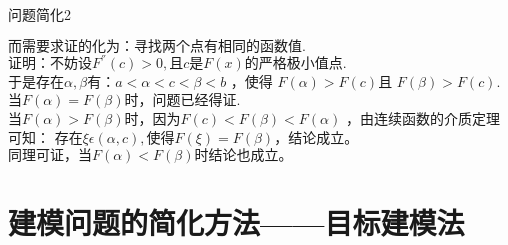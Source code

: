 \documentclass{beamer}
\begin{document}
\begin{frame}{问题简化2}
	\begin{spacing}{1.5}
		$\text{而需要求证的化为：寻找两个点有相同的函数值}.
		$
		$
		\text{证明：不妨设}F^{''}\left( c \right) >0,\text{且}c\text{是}F\left( x \right) \text{的严格极小值点}.
		$
		$
		\text{于是存在}\alpha ,\beta \text{有：}a<\alpha <c<\beta <b
		$
		，使得
		$F\left( \alpha \right) >F\left( c \right)
		$且
		$F\left( \beta \right) >F\left( c \right).
		$\\
		$
		\text{当}F\left( \alpha \right) =F\left( \beta \right) \text{时，问题已经得证}.
		$
		$
		\text{当}F\left( \alpha \right) >F\left( \beta \right) \text{时，因为}F\left( c \right) <F\left( \beta \right) <F\left( \alpha \right)
		$
		，由连续函数的介质定理可知：
		$
		\text{存在}\xi \epsilon \left( \alpha ,c \right) ,\text{使得}F\left( \xi \right) =F\left( \beta \right) \text{，结论成立。}
		$
		$
		\text{同理可证，当}F\left( \alpha \right) <F\left( \beta \right) \text{时结论也成立。}
		$
	\end{spacing}
\end{frame}






\section{建模问题的简化方法——目标建模法}
\end{document}
